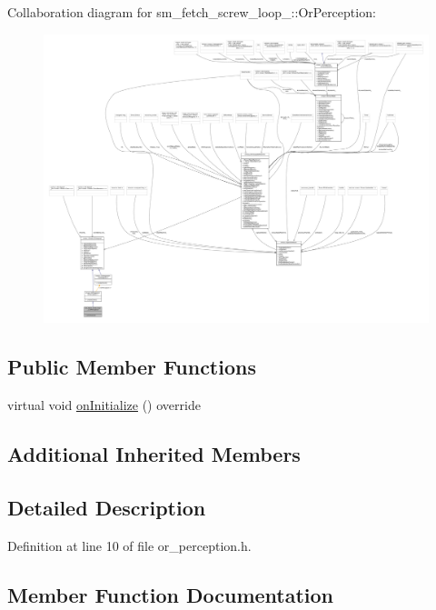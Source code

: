 Collaboration diagram for sm\+\_\+fetch\+\_\+screw\+\_\+loop\+\_\+:\+:Or\+Perception\+:
\nopagebreak
\begin{figure}[H]
\begin{center}
\leavevmode
\includegraphics[width=350pt]{classsm__fetch__screw__loop__1_1_1OrPerception__coll__graph}
\end{center}
\end{figure}
\subsection*{Public Member Functions}
\begin{DoxyCompactItemize}
\item 
virtual void \hyperlink{classsm__fetch__screw__loop__1_1_1OrPerception_a4c040bfe25ef00a97e2e035bf2d64915}{on\+Initialize} () override
\end{DoxyCompactItemize}
\subsection*{Additional Inherited Members}


\subsection{Detailed Description}


Definition at line 10 of file or\+\_\+perception.\+h.



\subsection{Member Function Documentation}
\mbox{\label{classsm__fetch__screw__loop__1_1_1OrPerception_a4c040bfe25ef00a97e2e035bf2d64915}} 

